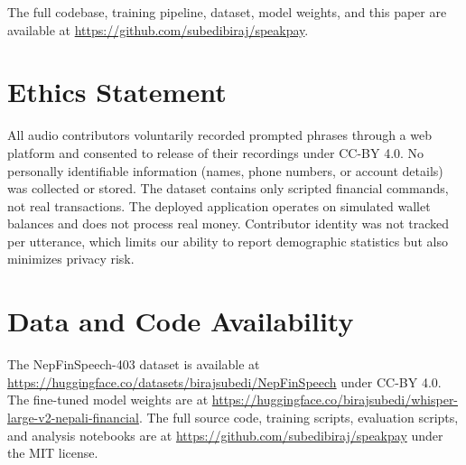 \documentclass[11pt,a4paper]{article}
\begin{document}
The full codebase, training pipeline, dataset, model weights, and this
paper are available at
\url{https://github.com/subedibiraj/speakpay}.

\section*{Ethics Statement}

All audio contributors voluntarily recorded prompted phrases through a web
platform and consented to release of their recordings under CC-BY 4.0.
No personally identifiable information (names, phone numbers, or account
details) was collected or stored. The dataset contains only scripted
financial commands, not real transactions. The deployed application
operates on simulated wallet balances and does not process real money.
Contributor identity was not tracked per utterance, which limits our
ability to report demographic statistics but also minimizes privacy risk.

\section*{Data and Code Availability}

The NepFinSpeech-403 dataset is available at
\url{https://huggingface.co/datasets/birajsubedi/NepFinSpeech} under
CC-BY 4.0. The fine-tuned model weights are at
\url{https://huggingface.co/birajsubedi/whisper-large-v2-nepali-financial}.
The full source code, training scripts, evaluation scripts, and analysis
notebooks are at
\url{https://github.com/subedibiraj/speakpay} under the MIT license.



\end{document}
